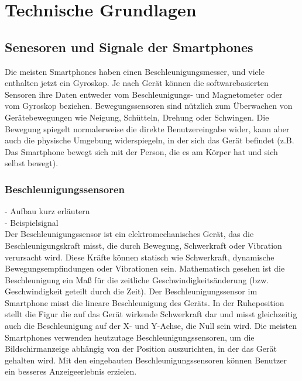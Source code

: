 %
%
%
%
\section{Technische Grundlagen} \label{Technik}



\subsection{Senesoren und Signale der Smartphones}

%
%
%
%
%
Die meisten Smartphones haben einen Beschleunigungsmesser, und viele enthalten jetzt ein Gyroskop. Je nach Gerät können die softwarebasierten Sensoren ihre Daten entweder vom Beschleunigungs- und Magnetometer oder vom Gyroskop beziehen. Bewegungssensoren sind nützlich zum Überwachen von Gerätebewegungen wie Neigung, Schütteln, Drehung oder Schwingen. Die Bewegung spiegelt normalerweise die direkte Benutzereingabe wider, kann aber auch die physische Umgebung widerspiegeln, in der sich das Gerät befindet (z.B. Das Smartphone bewegt sich mit der Person, die es am Körper hat und sich selbst bewegt).\cite{DevelopersMotionSen}



%
%
%
%


\subsubsection{Beschleunigungssensoren}
- Aufbau kurz erläutern\\
- Beispielsignal\\

Der Beschleunigungssensor ist ein elektromechanisches Gerät, das die Beschleunigungskraft misst, die durch Bewegung, Schwerkraft oder Vibration verursacht wird. Diese Kräfte können statisch wie Schwerkraft, dynamische Bewegungsempfindungen oder Vibrationen sein. Mathematisch gesehen ist die Beschleunigung ein Maß für die zeitliche Geschwindigkeitsänderung (bzw. Geschwindigkeit geteilt durch die Zeit).
Der Beschleunigungssensor im Smartphone misst die lineare Beschleunigung des Geräts. In der Ruheposition stellt die Figur die auf das Gerät wirkende Schwerkraft dar und misst gleichzeitig auch die Beschleunigung auf der X- und Y-Achse, die Null sein wird.
Die meisten Smartphones verwenden heutzutage Beschleunigungssensoren, um die Bildschirmanzeige abhängig von der Position auszurichten, in der das Gerät gehalten wird. Mit den eingebauten Beschleunigungssensoren können Benutzer ein besseres Anzeigeerlebnis erzielen. \cite{Sharma2020}

